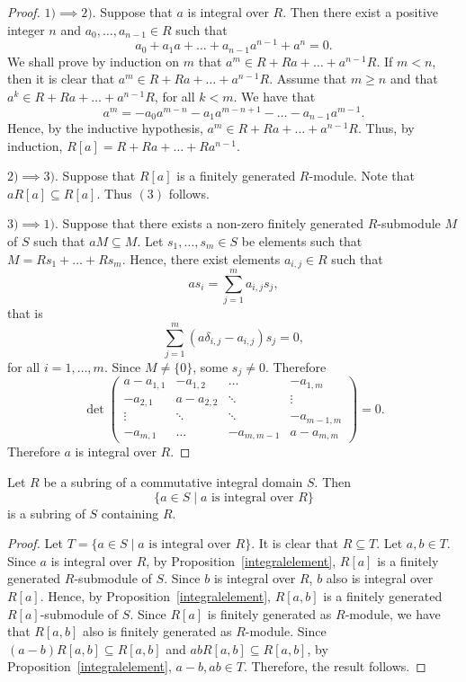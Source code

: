 \begin{proof}
    $1)\implies 2).$ Suppose that $a$ is integral over $R$. Then there exist a positive integer $n$ and $a_0,\dots ,a_{n-1}\in R$ 
    such that
    \[ a_0+a_1a+\dots +a_{n-1}a^{n-1}+a^n=0.\]
    We shall prove by induction on $m$ that $a^m\in R+Ra+\dots +a^{n-1}R$. If $m<n$, then it is clear that 
    $a^m\in R+Ra+\dots +a^{n-1}R$. Assume that $m\geq n$ and that $a^k\in R+Ra+\dots +a^{n-1}R$, for all $k<m$. We have that
    \[ a^m=-a_0a^{m-n}-a_1a^{m-n+1}-\dots -a_{n-1}a^{m-1}.\]
    Hence, by the inductive hypothesis, $a^m\in R+Ra+\dots +a^{n-1}R$. Thus, by induction, $R[a]=R+Ra+\dots +Ra^{n-1}$.
    
    $2)\implies 3)$. Suppose that $R[a]$ is a finitely generated $R$-module. Note that $aR[a]\subseteq R[a]$. Thus $(3)$ follows.
    
    $3)\implies 1)$. Suppose that there exists a non-zero finitely generated $R$-submodule $M$ of $S$ such that $aM\subseteq M$. 
    Let $s_1,\dots ,s_m\in S$ be elements such that
    $M=Rs_1+\dots +Rs_m$. Hence, there exist elements $a_{i,j}\in R$ such that
    \[ as_i=\sum_{j=1}^ma_{i,j}s_j,\]
    that is
    \[\sum_{j=1}^m(a\delta_{i,j}-a_{i,j})s_j=0,\]
    for all $i=1,\dots ,m$. Since $M\neq\{0\}$, some $s_j\neq 0$. Therefore
    \[\det\left(\begin{array}{cccc}
    a-a_{1,1}&-a_{1,2}&\ldots&-a_{1,m}\\
    -a_{2,1}&a-a_{2,2}&\ddots&\vdots\\
    \vdots&\ddots&\ddots&-a_{m-1,m}\\
    -a_{m,1}&\ldots&-a_{m,m-1}&a-a_{m,m}\end{array}\right)=0.\]
    Therefore $a$ is integral over $R$.
\end{proof}

\begin{corollary}\label{integralclousure}
    Let $R$ be a subring of a commutative integral domain $S$. Then 
    \[ \{ a\in S\mid a \mbox{ is integral over }R\}\]
    is a subring of $S$ containing $R$.
\end{corollary}

\begin{proof}
    Let $T=\{ a\in S\mid a \mbox{ is integral over }R\}$. It is clear that $R\subseteq T$. Let $a,b\in T$. 
    Since $a$ is integral over $R$,  by Proposition~\ref{integralelement}, $R[a]$ is a finitely generated $R$-submodule of $S$.
    Since $b$ is integral over $R$, $b$ also is integral over $R[a]$. Hence, by Proposition~\ref{integralelement}, 
    $R[a,b]$ is a finitely generated $R[a]$-submodule of $S$. Since $R[a]$ is finitely generated as $R$-module, we have that
    $R[a,b]$ also is finitely generated as $R$-module. Since $(a-b)R[a,b]\subseteq R[a,b]$ and $abR[a,b]\subseteq R[a,b]$, 
    by Proposition~\ref{integralelement}, $a-b,ab\in T$. Therefore, the result follows. 
\end{proof}

